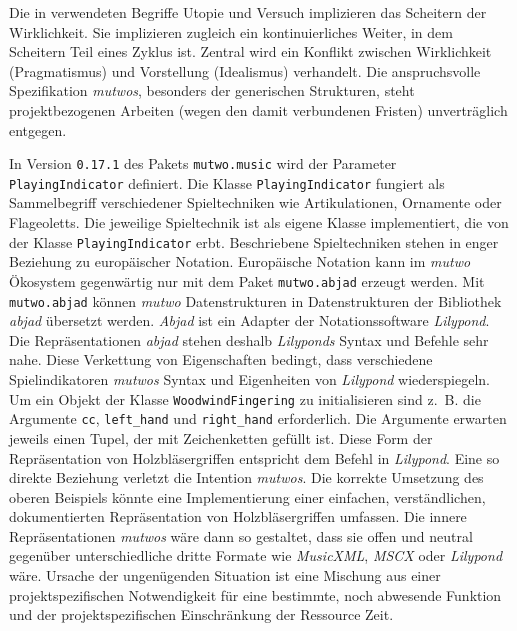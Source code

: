 \documentclass[12pt,a4paper,ngerman]{article}
\begin{document}
Die in \emph{} verwendeten Begriffe Utopie und Versuch implizieren das Scheitern der Wirklichkeit.
Sie implizieren zugleich ein kontinuierliches Weiter, in dem Scheitern Teil eines Zyklus ist.
Zentral wird ein Konflikt zwischen Wirklichkeit (Pragmatismus) und Vorstellung (Idealismus) verhandelt.
Die anspruchsvolle Spezifikation \emph{mutwos}, besonders der generischen Strukturen, steht projektbezogenen Arbeiten (wegen den damit verbundenen Fristen) unverträglich entgegen.

\smallskip

In Version \texttt{0.17.1} des Pakets \texttt{mutwo.music} wird der Parameter \texttt{PlayingIndicator} definiert.
Die Klasse \texttt{PlayingIndicator} fungiert als Sammelbegriff verschiedener Spieltechniken wie Artikulationen, Ornamente oder Flageoletts.
Die jeweilige Spieltechnik ist als eigene Klasse implementiert, die von der Klasse \texttt{PlayingIndicator} erbt.
Beschriebene Spieltechniken stehen in enger Beziehung zu europäischer Notation.
Europäische Notation kann im \emph{mutwo} Ökosystem gegenwärtig nur mit dem Paket \texttt{mutwo.abjad} erzeugt werden.
Mit \texttt{mutwo.abjad} können \emph{mutwo} Datenstrukturen in Datenstrukturen der Bibliothek \emph{abjad} übersetzt werden.
\emph{Abjad} ist ein Adapter der Notationssoftware \emph{Lilypond}.
Die Repräsentationen \emph{abjad} stehen deshalb \emph{Lilyponds} Syntax und Befehle sehr nahe.
Diese Verkettung von Eigenschaften bedingt, dass verschiedene Spielindikatoren \emph{mutwos} Syntax und Eigenheiten von \emph{Lilypond} wiederspiegeln.
Um ein Objekt der Klasse \texttt{WoodwindFingering} zu initialisieren sind z.~B. die Argumente \texttt{cc}, \texttt{left\_hand} und \texttt{right\_hand} erforderlich.
Die Argumente erwarten jeweils einen Tupel, der mit Zeichenketten gefüllt ist.
Diese Form der Repräsentation von Holzbläsergriffen entspricht dem Befehl in \emph{Lilypond}. 
Eine so direkte Beziehung verletzt die Intention \emph{mutwos}.
Die korrekte Umsetzung des oberen Beispiels könnte eine Implementierung einer einfachen, verständlichen, dokumentierten Repräsentation von Holzbläsergriffen umfassen.
Die innere Repräsentationen \emph{mutwos} wäre dann so gestaltet, dass sie offen und neutral gegenüber unterschiedliche dritte Formate wie \emph{MusicXML}, \emph{MSCX} oder \emph{Lilypond} wäre.
Ursache der ungenügenden Situation ist eine Mischung aus einer projektspezifischen Notwendigkeit für eine bestimmte, noch abwesende Funktion und der projektspezifischen Einschränkung der Ressource Zeit.
\end{document}
